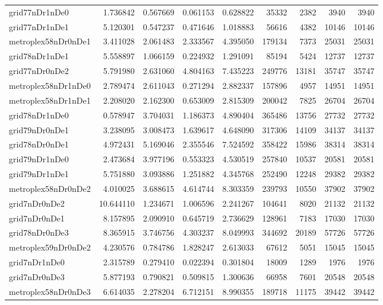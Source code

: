 \begin{longtable}{|l|r|r|r|r|r|r|r|r|}
grid77nDr1nDe0 & 1.736842 & 0.567669 & 0.061153 & 0.628822 & 35332 & 2382 & 3940 & 3940 \\
grid77nDr1nDe1 & 5.120301 & 0.547237 & 0.471646 & 1.018883 & 56616 & 4382 & 10146 & 10146 \\
metroplex58nDr0nDe1 & 3.411028 & 2.061483 & 2.333567 & 4.395050 & 179134 & 7373 & 25031 & 25031 \\
grid78nDr1nDe1 & 5.558897 & 1.066159 & 0.224932 & 1.291091 & 85194 & 5424 & 12737 & 12737 \\
grid77nDr0nDe2 & 5.791980 & 2.631060 & 4.804163 & 7.435223 & 249776 & 13181 & 35747 & 35747 \\
metroplex58nDr1nDe0 & 2.789474 & 2.611043 & 0.271294 & 2.882337 & 157896 & 4957 & 14951 & 14951 \\
metroplex58nDr1nDe1 & 2.208020 & 2.162300 & 0.653009 & 2.815309 & 200042 & 7825 & 26704 & 26704 \\
grid78nDr1nDe0 & 0.578947 & 3.704031 & 1.186373 & 4.890404 & 365486 & 13756 & 27732 & 27732 \\
grid79nDr0nDe1 & 3.238095 & 3.008473 & 1.639617 & 4.648090 & 317306 & 14109 & 34137 & 34137 \\
grid78nDr0nDe1 & 4.972431 & 5.169046 & 2.355546 & 7.524592 & 358422 & 15986 & 38314 & 38314 \\
grid79nDr1nDe0 & 2.473684 & 3.977196 & 0.553323 & 4.530519 & 257840 & 10537 & 20581 & 20581 \\
grid79nDr1nDe1 & 5.751880 & 3.093886 & 1.251882 & 4.345768 & 252490 & 12248 & 29382 & 29382 \\
metroplex58nDr0nDe2 & 4.010025 & 3.688615 & 4.614744 & 8.303359 & 239793 & 10550 & 37902 & 37902 \\
grid7nDr0nDe2 & 10.644110 & 1.234671 & 1.006596 & 2.241267 & 104641 & 8020 & 21132 & 21132 \\
grid7nDr0nDe1 & 8.157895 & 2.090910 & 0.645719 & 2.736629 & 128961 & 7183 & 17030 & 17030 \\
grid78nDr0nDe3 & 8.365915 & 3.746756 & 4.303237 & 8.049993 & 344692 & 20189 & 57726 & 57726 \\
metroplex59nDr0nDe2 & 4.230576 & 0.784786 & 1.828247 & 2.613033 & 67612 & 5051 & 15045 & 15045 \\
grid7nDr1nDe0 & 2.315789 & 0.279410 & 0.022394 & 0.301804 & 18009 & 1289 & 1976 & 1976 \\
grid7nDr0nDe3 & 5.877193 & 0.790821 & 0.509815 & 1.300636 & 66958 & 7601 & 20548 & 20548 \\
metroplex58nDr0nDe3 & 6.614035 & 2.278204 & 6.712151 & 8.990355 & 189718 & 11175 & 39442 & 39442 \\

\end{longtable}
